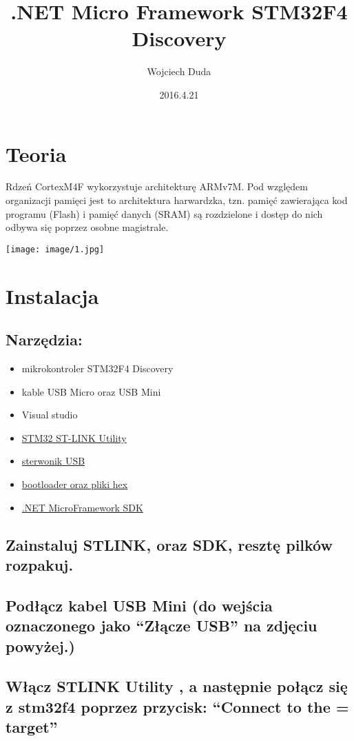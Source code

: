 ﻿\documentclass{article}
\title{.NET Micro Framework
STM32F4 Discovery}
\date{2016.4.21}
\author{Wojciech Duda}
\begin{document}
 
\maketitle 
{} 
\newpage
{}
\section{Teoria}
Rdzeń CortexM4F wykorzystuje architekturę ARMv7M. Pod względem organizacji pamięci jest to architektura harwardzka, tzn. pamięć zawierająca kod programu (Flash) i pamięć danych (SRAM) są rozdzielone i dostęp do nich odbywa się poprzez osobne magistrale.

\texttt{[image: image/1.jpg]}
\section{Instalacja}
\subsection{Narzędzia:}
\begin{itemize}
\item mikrokontroler STM32F4 Discovery
\item kable USB Micro oraz USB Mini
\item Visual studio
\item \href{http://www.st.com/content/st_com/en/products/embedded-software/development-tool-software/stsw-link004.html}{STM32 ST-LINK Utility}
\item \href{www.codeplex.com/Download?ProjectName=netmf4stm32&DownloadId=471395}{sterwonik USB}
\item \href{www.codeplex.com/Download?ProjectName=netmf4stm32&DownloadId=471396}{bootloader oraz pliki hex}
\item \href {netmf.codeplex.com/releases/view/91594}{.NET MicroFramework SDK}
\end{itemize}
\subsection{Zainstaluj STLINK, oraz SDK, resztę pilków rozpakuj.}
\subsection{Podłącz kabel USB Mini (do wejścia oznaczonego jako “Złącze USB” na zdjęciu powyżej.)}
\subsection{Włącz STLINK Utility , a następnie połącz się z stm32f4 poprzez przycisk: “Connect to the = target”}
\end{document}
